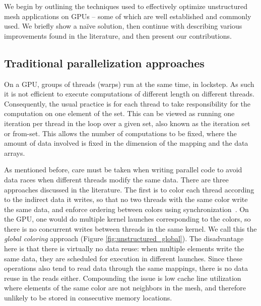 \noindent We begin by outlining the techniques used to effectively optimize 
unstructured mesh applications on GPUs -- some of which are well established 
and commonly used. We briefly show a na\"{i}ve solution, then continue 
with describing various improvements found in the literature, and then present 
our contributions.

\subsection{Traditional parallelization approaches}

\noindent On a GPU, groups of threads (warps) run at the same time, in 
lockstep. As such it is not efficient to execute computations of different 
length on different threads. Consequently, the usual practice is for each thread 
to take responsibility for the computation on one element of the set. This can 
be viewed as running one iteration per thread in the loop over a given set, also 
known as the iteration set or from-set. This allows the number of computations 
to be fixed, where the amount of data involved is fixed in the dimension of the 
mapping and the data arrays.

As mentioned before, care must be taken when writing parallel code to avoid 
data races when different threads modify the same data. There are three 
approaches discussed in the literature. The first is to color each thread 
according to the indirect data it writes, so that no two threads with the same 
color write the same data, and enforce ordering between colors using 
synchronization~\cite{Zegard2013}. On the GPU, one would do multiple kernel 
launches corresponding to the colors, so there is no concurrent writes between 
threads in the same kernel. We call this the \emph{global coloring} approach 
(Figure \ref{fig:unstructured_global}). The disadvantage here is that there is 
virtually no data reuse: when multiple elements write the same data, they are 
scheduled for execution in different launches. Since these operations also tend 
to read data through the same mappings, there is no data reuse in the reads 
either. Compounding the issue is low cache line utilization where elements of 
the same color are not neighbors in the mesh, and therefore unlikely to be 
stored in consecutive memory locations.


